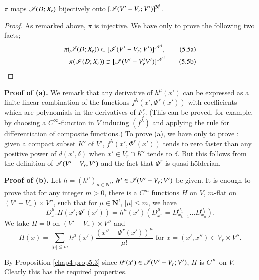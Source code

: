 \setcounter{theorem}{4}
\begin{proposition}\label{chap4-prop5.5}
$\pi$ maps $\mathscr{I} (D; X_r)$ bijectively onto $[\mathscr{I} (V' - V_r; V')]^{\mathbf{N}^l}$.
\end{proposition}


\begin{proof}
  As remarked above, $\pi$ is injective. We have only to prove the following two facts;
  \begin{align*}
\pi (\mathscr{I} (D;X_r)) \subset [\mathscr{I} (V' - V_r; V')]^{\mathscr{N}^l},      \tag{5.5a} \label{chap4-eq5.5a}\\
\pi(\mathscr{I} (D; X_r)) \supset [\mathscr{I} (V' - V_r' V')]^{\mathscr{N}^l}      \tag{5.5b} \label{chap4-eq5.5b}
  \end{align*}
\end{proof}

\medskip
\noindent
\textbf{Proof of (a).} We remark that any derivative of $h^{\mu} (x')$ can be expressed as a finite linear combination of the functions $f^\lambda (x', \Phi^r (x'))$ with coefficients which are polynomials in the derivatives of $F^r_j$. (This can be proved, for example, by choosing a $C^\infty$-function in $V$ inducing $(f^\lambda)$ and applying the rule for differentiation of composite functions.) To prove (a), we have only to prove : given a compact subset $K'$ of $V'$, $f^\lambda (x', \Phi^r (x'))$ tends to zero faster than any positive power of $d(x',\delta)$ when $x' \in V_r \cap K'$ tends to $\delta$. But this follows from the definition of $\mathscr{I} (V' - V_r, V')$ and the fact that $\Phi^r$ is quasi-h\"olderian.

\medskip
\noindent
\textbf{Proof of (b).} Let $h = (h^\mu)_{\mu \in \mathbf{N}^l}$, $h^\mu \in \mathscr{I} (V' - V_r; V')$ be given. It is enough to prove that for any integer $m >0$, there is a $C^m$ functions $H$ on $V$, $m$-flat on $(V'- V_r) \times V''$, such that for $ \mu \in \mathbf{N}^l$, $|\mu | \leq m$, we have
$$
D^\mu_{x''} H  (x'; \Phi^r (x')) = h^\mu (x') (D^{\mu}_{x''} = D^{\mu_1}_{x_{k+1}} \ldots D^{\mu_l}_{x_n}). 
$$
We take $H=0$ on $(V'-V_r) \times V''$ and
$$
H(x) = \sum\limits_{|\mu| \leq m} h^\mu (x') \frac{(x'' - \Phi^r (x'))^\mu}{\mu!} \text{ for } x = (x' , x'') \in V_r \times V''.
$$

By Proposition \ref{chap4-prop5.3} since $h^\mu (x') \in \mathscr{I} (V' - V_r ; V')$, $H$ is $C^\infty$ on $V$. Clearly this has the required properties.

